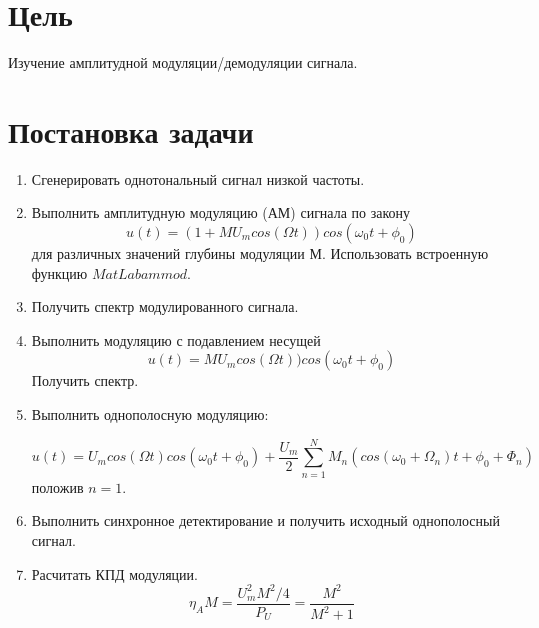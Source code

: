 \documentclass[a4paper]{article}
\begin{document}
\tableofcontents
\newpage
\section{Цель}
Изучение амплитудной модуляции/демодуляции сигнала.
\section{Постановка задачи}
\begin{enumerate}
    \item Сгенерировать однотональный сигнал низкой частоты.
    \item Выполнить амплитудную модуляцию (АМ) сигнала по закону $$u(t)=(1+MU_m cos(\Omega t))cos(\omega_0 t+\phi_0)$$ для различных значений глубины модуляции М. Использовать встроенную функцию $MatLab ammod$.
    \item Получить спектр модулированного сигнала.
    \item Выполнить модуляцию с подавлением несущей  $$u(t)=MU_m cos(\Omega t))cos(\omega_0 t+\phi_0)$$ Получить спектр.
    \item Выполнить однополосную модуляцию:

$$u(t)=U_m cos(\Omega t)cos(\omega_0 t+\phi_0) + \frac{U_m}{2} \sum_{n=1}^N M_n (cos(\omega_0+\Omega_n)t+\phi_0+\Phi_n)$$
положив $n=1$.
    \item Выполнить синхронное детектирование и получить исходный однополосный сигнал.
    \item Расчитать КПД модуляции. $$\eta_A M = \frac{U_m^2 M^2/4}{P_U} = \frac{M^2}{M^2+1}$$
\end{enumerate}
\end{document}
